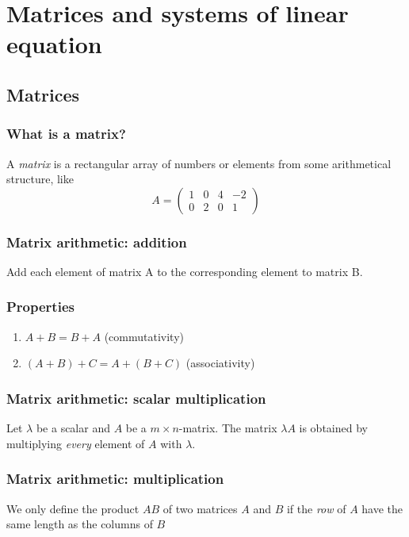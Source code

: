 \section{Matrices and systems of linear equation}

\subsection{Matrices}

\subsubsection{What is a matrix?}

\begin{definition}[Matrix]
    A \emph{matrix} is a rectangular array of numbers or elements from some arithmetical structure, like
    $$ A =
    \begin{pmatrix}
        1 & 0 & 4 & -2 \\
        0 & 2 & 0 & 1
    \end{pmatrix}
    $$
\end{definition}

\subsubsection{Matrix arithmetic: addition}
Add each element of matrix A to the corresponding element to matrix B.

\subsubsection{Properties}
\begin{enumerate}
    \item $ A + B = B + A $ (commutativity)
    \item $ (A + B) + C = A + (B + C) $ (associativity)
\end{enumerate}

\subsubsection{Matrix arithmetic: scalar multiplication}
Let $ \lambda $ be a scalar and $ A $ be a $ m \times n $-matrix.
The matrix $ \lambda A $ is obtained by multiplying \emph{every} element of $A$
with $\lambda$.

\subsubsection{Matrix arithmetic: multiplication}
We only define the product $AB$ of two matrices $A$ and $B$ if the
\emph{row} of $A$ have the same length as the columns of $B$

